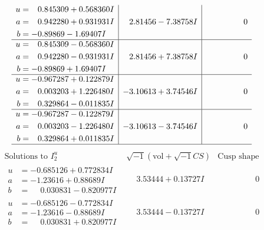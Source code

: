 \documentclass[1p]{elsarticle_modified}
\theoremstyle{definition}
\newcommand{\I}{\sqrt{-1}}
\begin{document}
$$\begin{array}{c|c|c}
\begin{aligned}
u &= \phantom{-}0.845309 + 0.568360 I \\
a &= \phantom{-}0.942280 + 0.931931 I \\
b &= -0.89869 - 1.69407 I\end{aligned}
 & \phantom{-}2.81456 - 7.38758 I & \phantom{-0.000000 } 0 \\ \hline\begin{aligned}
u &= \phantom{-}0.845309 - 0.568360 I \\
a &= \phantom{-}0.942280 - 0.931931 I \\
b &= -0.89869 + 1.69407 I\end{aligned}
 & \phantom{-}2.81456 + 7.38758 I & \phantom{-0.000000 } 0 \\ \hline\begin{aligned}
u &= -0.967287 + 0.122879 I \\
a &= \phantom{-}0.003203 + 1.226480 I \\
b &= \phantom{-}0.329864 - 0.011835 I\end{aligned}
 & -3.10613 + 3.74546 I & \phantom{-0.000000 } 0 \\ \hline\begin{aligned}
u &= -0.967287 - 0.122879 I \\
a &= \phantom{-}0.003203 - 1.226480 I \\
b &= \phantom{-}0.329864 + 0.011835 I\end{aligned}
 & -3.10613 - 3.74546 I & \phantom{-0.000000 } 0\\
 \hline 
 \end{array}$$\newpage$$\begin{array}{c|c|c}  
\text{Solutions to }I^u_{2}& \I (\text{vol} + \sqrt{-1}CS) & \text{Cusp shape}\\
 \hline 
\begin{aligned}
u &= -0.685126 + 0.772834 I \\
a &= -1.23616 + 0.88689 I \\
b &= \phantom{-}0.030831 - 0.820977 I\end{aligned}
 & \phantom{-}3.53444 + 0.13727 I & \phantom{-0.000000 } 0 \\ \hline\begin{aligned}
u &= -0.685126 - 0.772834 I \\
a &= -1.23616 - 0.88689 I \\
b &= \phantom{-}0.030831 + 0.820977 I\end{aligned}
 & \phantom{-}3.53444 - 0.13727 I & \phantom{-0.000000 } 0 \\ \hline\begin{aligned}

\end{aligned}
\end{array}$$
\end{document}
